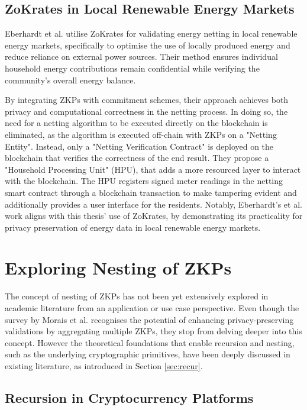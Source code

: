 \subsection{ZoKrates in Local Renewable Energy Markets}

Eberhardt et al.\cite{Netting} utilise ZoKrates for validating energy netting in local renewable energy markets, specifically to optimise the use of locally produced energy and reduce reliance on external power sources. Their method ensures individual household energy contributions remain confidential while verifying the community’s overall energy balance.  

By integrating ZKPs with commitment schemes, their approach achieves both privacy and computational correctness in the netting process. In doing so, the need for a netting algorithm to be executed directly on the blockchain is eliminated, as the algorithm is executed off-chain with ZKPs on a "Netting Entity". Instead, only a "Netting Verification Contract" is deployed on the blockchain that verifies the correctness of the end result. They propose a "Household Processing Unit" (HPU), that adds a more resourced layer to interact with the blockchain. The HPU registers signed meter readings in the netting smart contract through a blockchain transaction to make tampering evident and additionally provides a user interface for the residents. Notably, Eberhardt’s et al. work aligns with this thesis' use of ZoKrates, by demonstrating its practicality for privacy preservation of energy data in local renewable energy markets.


\section{Exploring Nesting of ZKPs\label{sec:netting}}

The concept of nesting of ZKPs has not been yet extensively explored in academic literature from an application or use case perspective. Even though the survey by Morais et al.\cite{morais2019survey}  recognises the potential of enhancing privacy-preserving validations by aggregating multiple ZKPs, they stop from delving deeper into this concept. However the theoretical foundations that enable recursion and nesting, such as the underlying cryptographic primitives, have been deeply discussed in existing literature, as introduced in Section \ref{sec:recur}.

\subsection{Recursion in Cryptocurrency Platforms}

